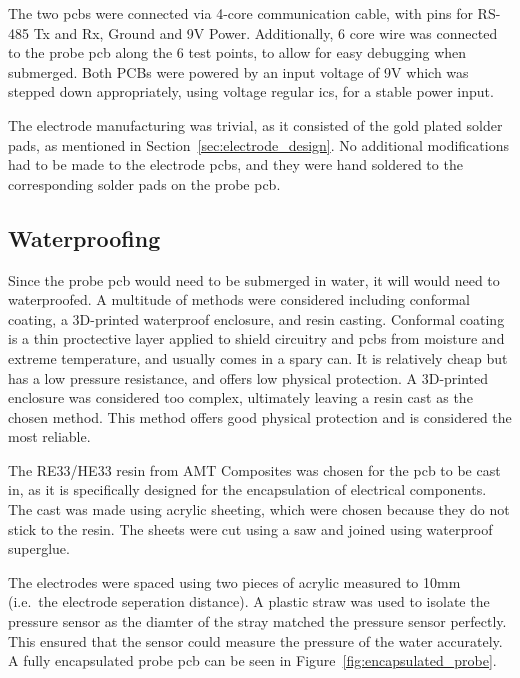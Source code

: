 \hfill \break

The two \gls{pcb}s were connected via 4-core communication cable, with pins for RS-485 Tx and Rx, Ground and 9V Power.
Additionally, 6 core wire was connected to the probe \gls{pcb} along the 6 test points, to allow for easy debugging when submerged.
Both PCBs were powered by an input voltage of 9V which was stepped down appropriately, using voltage regular \gls{ic}s, for a stable power input.

The electrode manufacturing was trivial, as it consisted of the gold plated solder pads, as mentioned in Section~\ref{sec:electrode_design}.
No additional modifications had to be made to the electrode \gls{pcb}s, and they were hand soldered to the corresponding solder pads on the probe \gls{pcb}.

\subsection{Waterproofing}
Since the probe \gls{pcb} would need to be submerged in water, it will would need to waterproofed.
A multitude of methods were considered including conformal coating, a 3D-printed waterproof enclosure, and resin casting.
Conformal coating is a thin proctective layer applied to shield circuitry and \gls{pcb}s from moisture and extreme temperature, and usually comes in a spary can.
It is relatively cheap but has a low pressure resistance, and offers low physical protection.
A 3D-printed enclosure was considered too complex, ultimately leaving a resin cast as the chosen method.
This method offers good physical protection and is considered the most reliable.

The RE33/HE33 resin from AMT Composites was chosen for the \gls{pcb} to be cast in, as it is specifically designed for the encapsulation of electrical components.
The cast was made using acrylic sheeting, which were chosen because they do not stick to the resin.
The sheets were cut using a saw and joined using waterproof superglue.

The electrodes were spaced using two pieces of acrylic measured to 10mm (i.e.~the electrode seperation distance).
A plastic straw was used to isolate the pressure sensor as the diamter of the stray matched the pressure sensor perfectly.
This ensured that the sensor could measure the pressure of the water accurately.
A fully encapsulated probe \gls{pcb} can be seen in Figure~\ref{fig:encapsulated_probe}.

